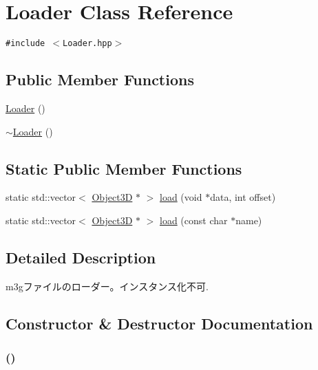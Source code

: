 \hypertarget{classm3g_1_1Loader}{
\section{Loader Class Reference}
\label{classm3g_1_1Loader}
}
{\tt \#include $<$Loader.hpp$>$}

\subsection*{Public Member Functions}
\begin{CompactItemize}
\item 
\hyperlink{classm3g_1_1Loader_c082256071478316a982894d4191a11a}{Loader} ()
\item 
\hyperlink{classm3g_1_1Loader_8bd25dd3f34914f06852c2de2f9db737}{$\sim$Loader} ()
\end{CompactItemize}
\subsection*{Static Public Member Functions}
\begin{CompactItemize}
\item 
static std::vector$<$ \hyperlink{classm3g_1_1Object3D}{Object3D} $\ast$ $>$ \hyperlink{classm3g_1_1Loader_7abddd36a9ee70e67de0e2183bba1aed}{load} (void $\ast$data, int offset)
\item 
static std::vector$<$ \hyperlink{classm3g_1_1Object3D}{Object3D} $\ast$ $>$ \hyperlink{classm3g_1_1Loader_27bd86888cdadd349223dcb303e45879}{load} (const char $\ast$name)
\end{CompactItemize}


\subsection{Detailed Description}
m3gファイルのローダー。インスタンス化不可. 

\subsection{Constructor \& Destructor Documentation}
\hypertarget{classm3g_1_1Loader_c082256071478316a982894d4191a11a}{
\subsubsection[{Loader}]{ ()}}
\label{classm3g_1_1Loader_c082256071478316a982894d4191a11a}


